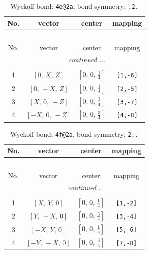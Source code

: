 \documentclass[fleqn,8pt]{jsarticle}
\begin{document}
\renewcommand{\arraystretch}{1.2}
\begin{longtable}{cccc}
\caption{Wyckoff bond: {\tt 4e@2a}, bond symmetry: {\tt .2.}}
 \\
 \hline \hline
No. & vector & center & mapping \\ \hline \endfirsthead

\multicolumn{3}{l}{\tablename\ \thetable{}} \\
 \hline \hline
No. & vector & center & mapping \\ \hline \endhead

 \hline \hline
\multicolumn{3}{r}{\footnotesize\it continued ...} \\ \endfoot

 \hline \hline
\multicolumn{3}{r}{} \\ \endlastfoot

1 & $\left[ 0,\, X,\, Z \right]$ & $\left[ 0,\, 0,\, \frac{1}{4} \right]$ & {\tt [1,-6]} \\ \hline
2 & $\left[ 0,\, - X,\, Z \right]$ & $\left[ 0,\, 0,\, \frac{1}{4} \right]$ & {\tt [2,-5]} \\ \hline
3 & $\left[ X,\, 0,\, - Z \right]$ & $\left[ 0,\, 0,\, \frac{3}{4} \right]$ & {\tt [3,-7]} \\ \hline
4 & $\left[ - X,\, 0,\, - Z \right]$ & $\left[ 0,\, 0,\, \frac{3}{4} \right]$ & {\tt [4,-8]} \\
\end{longtable}
\renewcommand{\arraystretch}{1.2}
\begin{longtable}{cccc}
\caption{Wyckoff bond: {\tt 4f@2a}, bond symmetry: {\tt 2..}}
 \\
 \hline \hline
No. & vector & center & mapping \\ \hline \endfirsthead

\multicolumn{3}{l}{\tablename\ \thetable{}} \\
 \hline \hline
No. & vector & center & mapping \\ \hline \endhead

 \hline \hline
\multicolumn{3}{r}{\footnotesize\it continued ...} \\ \endfoot

 \hline \hline
\multicolumn{3}{r}{} \\ \endlastfoot

1 & $\left[ X,\, Y,\, 0 \right]$ & $\left[ 0,\, 0,\, \frac{1}{4} \right]$ & {\tt [1,-2]} \\ \hline
2 & $\left[ Y,\, - X,\, 0 \right]$ & $\left[ 0,\, 0,\, \frac{3}{4} \right]$ & {\tt [3,-4]} \\ \hline
3 & $\left[ - X,\, Y,\, 0 \right]$ & $\left[ 0,\, 0,\, \frac{1}{4} \right]$ & {\tt [5,-6]} \\ \hline
4 & $\left[ - Y,\, - X,\, 0 \right]$ & $\left[ 0,\, 0,\, \frac{3}{4} \right]$ & {\tt [7,-8]} \\
\end{longtable}
\end{document}

